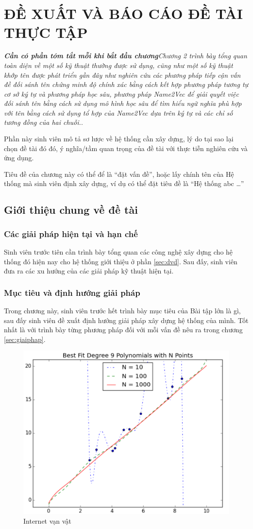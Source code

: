 \chapter{ĐỀ XUẤT VÀ BÁO CÁO ĐỀ TÀI THỰC TẬP}
\textbf{\textit{Cần có phần tóm tắt mỗi khi bắt đầu chương}}\textit{Chương 2 trình bày tổng quan toàn diện về một số kỹ thuật thường được sử dụng, cũng như một số kỹ thuật khớp tên được phát triển gần đây như nghiên cứu các phương pháp tiếp cận vấn đề đối sánh tên chứng minh độ chính xác bằng cách kết hợp phương pháp tương tự cơ sở ký tự và phương pháp học sâu, phương pháp Name2Vec để giải quyết việc đối sánh tên bằng cách sử dụng mô hình học sâu để tìm hiểu ngữ nghĩa phù hợp với tên bằng cách sử dụng tổ hợp của Name2Vec dựa trên ký tự và các chỉ số tương đồng của hai chuỗi.}.

Phần này sinh viên mô tả sơ lược về hệ thống cần xây dựng, lý do tại sao lại chọn đề tài đó  đó, ý nghĩa/tầm quan trọng của đề tài với thực tiễn nghiên cứu và ứng dụng.

Tiêu đề của chương này có thể để là ``đặt vấn đề'', hoặc lấy chính tên của Hệ thống mà sinh viên định xây dựng, ví dụ có thể đặt tiêu đề là ``Hệ thống abc …” 
\section{Giới thiệu chung về đề tài}
\subsection*{Các giải pháp hiện tại và hạn chế}
\label{sec:giaiphap}
Sinh viên trước tiên cần trình bày tổng quan các công nghệ xây dựng cho hệ thống đó hiện nay cho hệ thống giới thiệu ở phần \ref{sec:dvd}. Sau đấy, sinh viên đưa ra các xu hướng của các giải pháp kỹ thuật hiện tại. 

\subsection*{Mục tiêu và định hướng giải pháp}
Trong chương này, sinh viên trước hết trình bày mục tiêu của Bài tập lớn là gì, sau đấy sinh viên đề xuất định hướng giải pháp xây dựng hệ thống của mình. Tốt nhất là với trình bày từng phương pháp đối với mỗi vấn đề nêu ra trong chương \ref{sec:giaiphap}. 
\begin{figure}[h]
\centering
\includegraphics[width=0.5\linewidth]{Figures/bias.png}
\caption{Internet vạn vật}
\label{fig:iot}
\end{figure}

